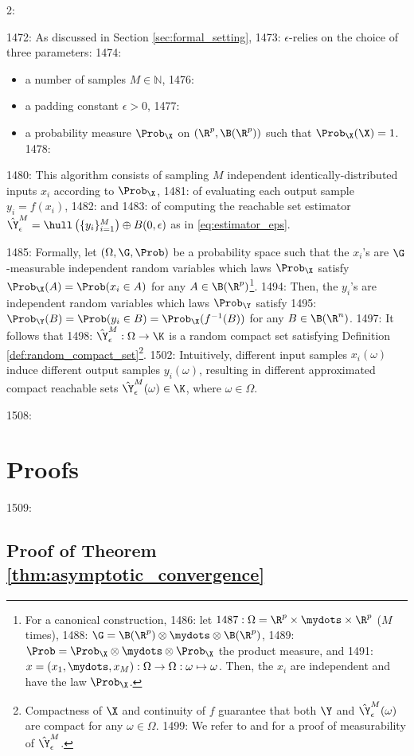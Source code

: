 2: \documentclass[12pt]{l4dc2022} %
\begin{document}
1472: As discussed in Section  \ref{sec:formal_setting}, 
1473: $\epsilon$-\randup relies on the choice of three parameters: 
1474: \begin{itemize}\setlength\itemsep{0.5mm}
1475: \item a number of samples $M\in\mathbb{N}$, 
1476: \item a padding constant $\epsilon>0$, 
1477: \item a probability measure $\Prob_\X$ on $(\R^{p},\B(\R^{p}))$ such that $\Prob_\X(\X)=1$. 
1478: \end{itemize}
1480: This algorithm consists of sampling $M$ independent identically-distributed inputs $x_i$ according to $\Prob_\X$, 
1481: of evaluating each output sample $y_i=f(x_i)$, %
1482: and 
1483: of computing the reachable set estimator $\hat\Y_\epsilon^M=\hull\left(\{y_i\}_{i{=}1}^M\right)\oplus B(0,\epsilon)$ as in \eqref{eq:estimator_eps}. 

1485: Formally, let $(\Omega,\G,\Prob)$ be a probability space such that the $x_i$'s are $\G$-measurable independent random variables which laws $\Prob_\X$ satisfy  $\Prob_\X(A)=\Prob(x_i\in A)$ for any $A\in\B(\R^p)$\footnote{For a canonical construction, 
1486: let $
1487: \Omega=\R^p\times\mydots\times\R^p$ ($M$ times), 
1488: $\G=\B(\R^p)\otimes\mydots\otimes\B(\R^p)$,  
1489: $\Prob=\Prob_\X\otimes\mydots\otimes\Prob_\X$ the product measure, and %
1491: $x=(x_1,\mydots,x_M): \Omega\rightarrow\Omega:  \omega\mapsto\omega$. Then, the $x_i$ are independent and have the law $\Prob_\X$.}. %
1494: Then, the $y_i$'s are independent random variables which laws $\Prob_{\Y}$ satisfy %
1495: $\Prob_{\Y}(B)=\Prob(y_i\in B)=\Prob_\X(f^{-1}(B))$ for any $B\in\B(\R^n)$. 
1497: It follows that  
1498: $\hat\Y_\epsilon^M:\Omega\rightarrow\K$ is a random compact set satisfying Definition \ref{def:random_compact_set}\footnote{Compactness of $\X$ and continuity of $f$ guarantee that both $\Y$ and $\hat\Y_\epsilon^M(\omega)$ are compact for any $\omega\in\Omega$. 
1499: We refer to \citep{Molchanov_BookTheoryOfRandomSets2017} and \citep{LewPavone2020} for a proof of measurability of $\hat\Y_\epsilon^M$.}. 
1502: Intuitively, different input samples $x_i(\omega)$  induce different output samples $y_i(\omega)$, resulting in  different approximated compact reachable sets $\hat\Y_\epsilon^M(\omega)\in\K$, where  $\omega\in\Omega$.  

1508: \section{Proofs}\label{appendix:proofs}
1509: \subsection{Proof of Theorem \ref{thm:asymptotic_convergence}}\label{apdx:proof:thm:asymptotic_convergence}
\end{document}
